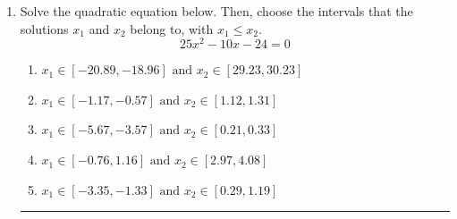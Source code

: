 \documentclass[14pt]{extbook}
\newcommand{\litem}[1]{\item#1\hspace*{-1cm}\rule{\textwidth}{0.4pt}}
\begin{document}
\begin{enumerate}
{\begin{enumerate}[label=\Alph*.]
\end{enumerate} }
\litem{
Solve the quadratic equation below. Then, choose the intervals that the solutions $x_1$ and $x_2$ belong to, with $x_1 \leq x_2$.\[ 25x^{2} -10 x -24 = 0 \]\begin{enumerate}[label=\Alph*.]
\item \( x_1 \in [-20.89, -18.96] \text{ and } x_2 \in [29.23, 30.23] \)
\item \( x_1 \in [-1.17, -0.57] \text{ and } x_2 \in [1.12, 1.31] \)
\item \( x_1 \in [-5.67, -3.57] \text{ and } x_2 \in [0.21, 0.33] \)
\item \( x_1 \in [-0.76, 1.16] \text{ and } x_2 \in [2.97, 4.08] \)
\item \( x_1 \in [-3.35, -1.33] \text{ and } x_2 \in [0.29, 1.19] \)

\end{enumerate} }
\end{enumerate}
\end{document}
